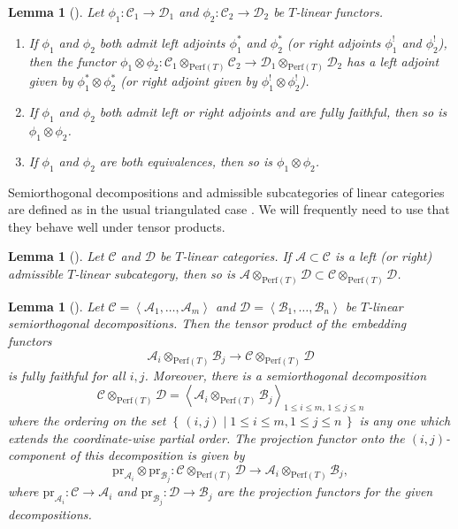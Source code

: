 \documentclass[11pt, reqno]{amsart}
\numberwithin{equation}{section}
\theoremstyle{plain}
\newtheorem{lemma}[theorem]{Lemma}
\theoremstyle{definition}
\newcommand{\st}{\mid}
\newcommand{\set}[1]{\left\{ \, #1 \, \right\}}
\newcommand{\Perf}{\mathrm{Perf}}
\newcommand{\llangle}{\left \langle}
\newcommand{\rrangle}{\right \rangle}
\newcommand{\pr}{\mathrm{pr}}
\newcommand{\cA}{\mathcal{A}}
\newcommand{\cB}{\mathcal{B}}
\newcommand{\cC}{\mathcal{C}}
\newcommand{\cD}{\mathcal{D}}
\begin{document}
\begin{lemma}[{\cite[Lemmas 2.12]{NCHPD}}] 
\label{lemma-adjoints}
Let $\phi_1 \colon \cC_1 \to \cD_1$ and $\phi_2 \colon \cC_2 \to \cD_2$ be $T$-linear functors. 
\begin{enumerate}
\item 
If $\phi_1$ and $\phi_2$ both admit left adjoints $\phi_1^*$ and $\phi_2^*$ \textup(or right adjoints $\phi_1^!$ and $\phi_2^!$\textup), 
then the functor $\phi_1 \otimes \phi_2 \colon \cC_1 \otimes_{\Perf(T)} \cC_2 \to \cD_1 \otimes_{\Perf(T)} \cD_2$ has a 
left adjoint given by $\phi_1^* \otimes \phi_2^*$ \textup(or right adjoint given by $\phi_1^! \otimes \phi_2^!$\textup). 
\item 
If $\phi_1$ and $\phi_2$ both admit left or right adjoints and are fully faithful, then so is 
$\phi_1 \otimes \phi_2$. 

\item 
If $\phi_1$ and $\phi_2$ are both equivalences, then so is $\phi_1 \otimes \phi_2$. 
\end{enumerate}
\end{lemma} 

Semiorthogonal decompositions and admissible subcategories 
of linear categories are defined as in the usual triangulated case \cite[Definitions 3.1 and 3.5]{NCHPD}. 
We will frequently need to use that they behave well under tensor products. 

\begin{lemma}[{\cite[Lemma 3.17]{NCHPD}}]
\label{lemma-admissible-tensor}
Let $\cC$ and $\cD$ be $T$-linear categories. 
If $\cA \subset \cC$ is a left \textup(or right\textup) admissible $T$-linear subcategory, then 
so is $\cA \otimes_{\Perf(T)} \cD \subset \cC \otimes_{\Perf(T)} \cD$. 
\end{lemma}

\begin{lemma}[{\cite[Lemma 3.15]{NCHPD}}]
\label{lemma-sod-tensor}
Let $\cC = \llangle \cA_1, \dots, \cA_m \rrangle$ and $\cD = \llangle \cB_1, \dots, \cB_{n} \rrangle$  
be $T$-linear semiorthogonal decompositions. 
Then the tensor product of the embedding functors 
\begin{equation*}
\cA_i \otimes_{\Perf(T)} \cB_j \to \cC \otimes_{\Perf(T)} \cD
\end{equation*}
is fully faithful for all $i,j$. 
Moreover, there is a semiorthogonal decomposition 
\begin{equation*}
\cC \otimes_{\Perf(T)} \cD = \llangle \cA_i \otimes_{\Perf(T)} \cB_j \rrangle_{1 \leq i \leq m,\, 1 \leq j \leq n} 
\end{equation*} 
where the ordering on the set $\set{ (i,j) \st  1 \leq i \leq m , 1 \leq j \leq n }$ is any 
one which extends the coordinate-wise partial order. 
The projection functor onto the $(i,j)$-component of this decomposition is given by 
\begin{equation*}
\pr_{\cA_i} \otimes \pr_{\cB_j} \colon \cC \otimes_{\Perf(T)} \cD \to  \cA_i \otimes_{\Perf(T)} \cB_j, 
\end{equation*} 
where $\pr_{\cA_i} \colon \cC \to \cA_i$ and $\pr_{\cB_j} \colon \cD \to \cB_j$ are the projection 
functors for the given decompositions.
\end{lemma}
\end{document}
